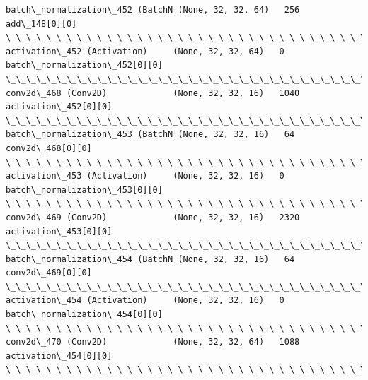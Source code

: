 \documentclass[11pt]{article}
\begin{document}
\begin{Verbatim}[commandchars=\\\{\}]
batch\_normalization\_452 (BatchN (None, 32, 32, 64)   256         add\_148[0][0]                    
\_\_\_\_\_\_\_\_\_\_\_\_\_\_\_\_\_\_\_\_\_\_\_\_\_\_\_\_\_\_\_\_\_\_\_\_\_\_\_\_\_\_\_\_\_\_\_\_\_\_\_\_\_\_\_\_\_\_\_\_\_\_\_\_\_\_\_\_\_\_\_\_\_\_\_\_\_\_\_\_\_\_\_\_\_\_\_\_\_\_\_\_\_\_\_\_\_\_
activation\_452 (Activation)     (None, 32, 32, 64)   0           batch\_normalization\_452[0][0]    
\_\_\_\_\_\_\_\_\_\_\_\_\_\_\_\_\_\_\_\_\_\_\_\_\_\_\_\_\_\_\_\_\_\_\_\_\_\_\_\_\_\_\_\_\_\_\_\_\_\_\_\_\_\_\_\_\_\_\_\_\_\_\_\_\_\_\_\_\_\_\_\_\_\_\_\_\_\_\_\_\_\_\_\_\_\_\_\_\_\_\_\_\_\_\_\_\_\_
conv2d\_468 (Conv2D)             (None, 32, 32, 16)   1040        activation\_452[0][0]             
\_\_\_\_\_\_\_\_\_\_\_\_\_\_\_\_\_\_\_\_\_\_\_\_\_\_\_\_\_\_\_\_\_\_\_\_\_\_\_\_\_\_\_\_\_\_\_\_\_\_\_\_\_\_\_\_\_\_\_\_\_\_\_\_\_\_\_\_\_\_\_\_\_\_\_\_\_\_\_\_\_\_\_\_\_\_\_\_\_\_\_\_\_\_\_\_\_\_
batch\_normalization\_453 (BatchN (None, 32, 32, 16)   64          conv2d\_468[0][0]                 
\_\_\_\_\_\_\_\_\_\_\_\_\_\_\_\_\_\_\_\_\_\_\_\_\_\_\_\_\_\_\_\_\_\_\_\_\_\_\_\_\_\_\_\_\_\_\_\_\_\_\_\_\_\_\_\_\_\_\_\_\_\_\_\_\_\_\_\_\_\_\_\_\_\_\_\_\_\_\_\_\_\_\_\_\_\_\_\_\_\_\_\_\_\_\_\_\_\_
activation\_453 (Activation)     (None, 32, 32, 16)   0           batch\_normalization\_453[0][0]    
\_\_\_\_\_\_\_\_\_\_\_\_\_\_\_\_\_\_\_\_\_\_\_\_\_\_\_\_\_\_\_\_\_\_\_\_\_\_\_\_\_\_\_\_\_\_\_\_\_\_\_\_\_\_\_\_\_\_\_\_\_\_\_\_\_\_\_\_\_\_\_\_\_\_\_\_\_\_\_\_\_\_\_\_\_\_\_\_\_\_\_\_\_\_\_\_\_\_
conv2d\_469 (Conv2D)             (None, 32, 32, 16)   2320        activation\_453[0][0]             
\_\_\_\_\_\_\_\_\_\_\_\_\_\_\_\_\_\_\_\_\_\_\_\_\_\_\_\_\_\_\_\_\_\_\_\_\_\_\_\_\_\_\_\_\_\_\_\_\_\_\_\_\_\_\_\_\_\_\_\_\_\_\_\_\_\_\_\_\_\_\_\_\_\_\_\_\_\_\_\_\_\_\_\_\_\_\_\_\_\_\_\_\_\_\_\_\_\_
batch\_normalization\_454 (BatchN (None, 32, 32, 16)   64          conv2d\_469[0][0]                 
\_\_\_\_\_\_\_\_\_\_\_\_\_\_\_\_\_\_\_\_\_\_\_\_\_\_\_\_\_\_\_\_\_\_\_\_\_\_\_\_\_\_\_\_\_\_\_\_\_\_\_\_\_\_\_\_\_\_\_\_\_\_\_\_\_\_\_\_\_\_\_\_\_\_\_\_\_\_\_\_\_\_\_\_\_\_\_\_\_\_\_\_\_\_\_\_\_\_
activation\_454 (Activation)     (None, 32, 32, 16)   0           batch\_normalization\_454[0][0]    
\_\_\_\_\_\_\_\_\_\_\_\_\_\_\_\_\_\_\_\_\_\_\_\_\_\_\_\_\_\_\_\_\_\_\_\_\_\_\_\_\_\_\_\_\_\_\_\_\_\_\_\_\_\_\_\_\_\_\_\_\_\_\_\_\_\_\_\_\_\_\_\_\_\_\_\_\_\_\_\_\_\_\_\_\_\_\_\_\_\_\_\_\_\_\_\_\_\_
conv2d\_470 (Conv2D)             (None, 32, 32, 64)   1088        activation\_454[0][0]             
\_\_\_\_\_\_\_\_\_\_\_\_\_\_\_\_\_\_\_\_\_\_\_\_\_\_\_\_\_\_\_\_\_\_\_\_\_\_\_\_\_\_\_\_\_\_\_\_\_\_\_\_\_\_\_\_\_\_\_\_\_\_\_\_\_\_\_\_\_\_\_\_\_\_\_\_\_\_\_\_\_\_\_\_\_\_\_\_\_\_\_\_\_\_\_\_\_\_

\end{Verbatim}
\end{document}
